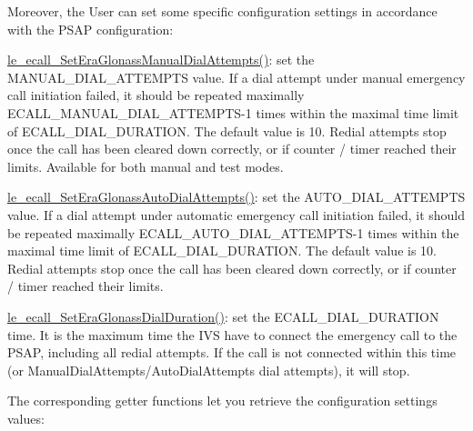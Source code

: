 Moreover, the User can set some specific configuration settings in accordance with the P\+S\+A\+P configuration\+:


\begin{DoxyItemize}
\item \hyperlink{le__ecall__interface_8h_a15127a7b0500796257795aaf64acd1e2}{le\+\_\+ecall\+\_\+\+Set\+Era\+Glonass\+Manual\+Dial\+Attempts()}\+: set the M\+A\+N\+U\+A\+L\+\_\+\+D\+I\+A\+L\+\_\+\+A\+T\+T\+E\+M\+P\+T\+S value. If a dial attempt under manual emergency call initiation failed, it should be repeated maximally E\+C\+A\+L\+L\+\_\+\+M\+A\+N\+U\+A\+L\+\_\+\+D\+I\+A\+L\+\_\+\+A\+T\+T\+E\+M\+P\+T\+S-\/1 times within the maximal time limit of E\+C\+A\+L\+L\+\_\+\+D\+I\+A\+L\+\_\+\+D\+U\+R\+A\+T\+I\+O\+N. The default value is 10. Redial attempts stop once the call has been cleared down correctly, or if counter / timer reached their limits. Available for both manual and test modes.
\item \hyperlink{le__ecall__interface_8h_a836aaf195c0648d41f4a13f8c7ced736}{le\+\_\+ecall\+\_\+\+Set\+Era\+Glonass\+Auto\+Dial\+Attempts()}\+: set the A\+U\+T\+O\+\_\+\+D\+I\+A\+L\+\_\+\+A\+T\+T\+E\+M\+P\+T\+S value. If a dial attempt under automatic emergency call initiation failed, it should be repeated maximally E\+C\+A\+L\+L\+\_\+\+A\+U\+T\+O\+\_\+\+D\+I\+A\+L\+\_\+\+A\+T\+T\+E\+M\+P\+T\+S-\/1 times within the maximal time limit of E\+C\+A\+L\+L\+\_\+\+D\+I\+A\+L\+\_\+\+D\+U\+R\+A\+T\+I\+O\+N. The default value is 10. Redial attempts stop once the call has been cleared down correctly, or if counter / timer reached their limits.
\item \hyperlink{le__ecall__interface_8h_a6c934a9e5aad11eb6f009a6bf34fca19}{le\+\_\+ecall\+\_\+\+Set\+Era\+Glonass\+Dial\+Duration()}\+: set the E\+C\+A\+L\+L\+\_\+\+D\+I\+A\+L\+\_\+\+D\+U\+R\+A\+T\+I\+O\+N time. It is the maximum time the I\+V\+S have to connect the emergency call to the P\+S\+A\+P, including all redial attempts. If the call is not connected within this time (or Manual\+Dial\+Attempts/\+Auto\+Dial\+Attempts dial attempts), it will stop.
\end{DoxyItemize}

The corresponding getter functions let you retrieve the configuration settings values\+:


